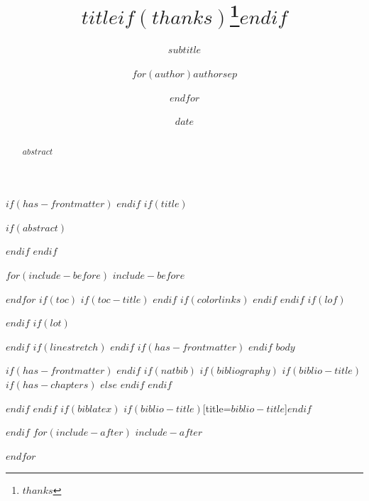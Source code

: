 \documentclass[
$if(fontsize)$
    $fontsize$,
$else$
    12pt,
$endif$
$for(classoption)$
    $classoption$$sep$,
$endfor$
    a4paper
]{article}
\title{$title$$if(thanks)$\thanks{$thanks$}$endif$}
\subtitle{$subtitle$}
\author{$for(author)$$author$$sep$ \and $endfor$}
\date{$date$}
\begin{document}
$if(has-frontmatter)$
\frontmatter
$endif$
$if(title)$
\maketitle
$if(abstract)$
\begin{abstract}
$abstract$
\end{abstract}
$endif$
$endif$

$for(include-before)$
$include-before$

$endfor$
$if(toc)$
$if(toc-title)$
\renewcommand*\contentsname{$toc-title$}
$endif$
{
$if(colorlinks)$
\hypersetup{linkcolor=$if(toccolor)$$toccolor$$else$$endif$}
$endif$
\setcounter{tocdepth}{$toc-depth$}
\tableofcontents
}
$endif$
$if(lof)$
\listoffigures
$endif$
$if(lot)$
\listoftables
$endif$
$if(linestretch)$
$endif$
$if(has-frontmatter)$
\mainmatter
$endif$
$body$

$if(has-frontmatter)$
\backmatter
$endif$
$if(natbib)$
$if(bibliography)$
$if(biblio-title)$
$if(has-chapters)$
\renewcommand\bibname{$biblio-title$}
$else$
\renewcommand\refname{$biblio-title$}
$endif$
$endif$


$endif$
$endif$
$if(biblatex)$
\printbibliography$if(biblio-title)$[title=$biblio-title$]$endif$

$endif$
$for(include-after)$
$include-after$

$endfor$
\end{document}
